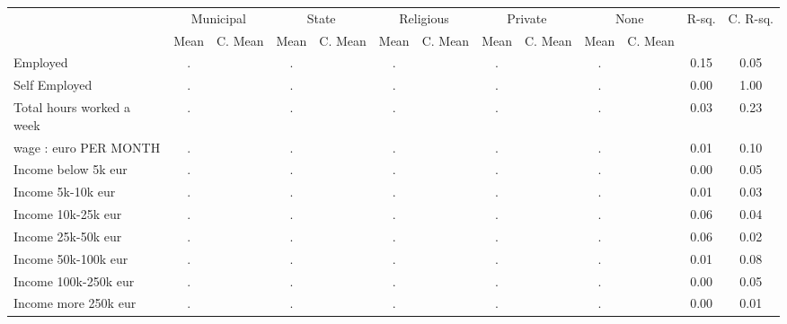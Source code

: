\begin{tabular}{l c c c c c c c c c c c c}
\toprule
& \multicolumn{2}{c}{Municipal} & \multicolumn{2}{c}{State} & \multicolumn{2}{c}{Religious} & \multicolumn{2}{c}{Private} & \multicolumn{2}{c}{None} & R-sq. & C. R-sq. \\
& \scriptsize Mean & \scriptsize C. Mean & \scriptsize Mean & \scriptsize C. Mean & \scriptsize Mean & \scriptsize C. Mean & \scriptsize Mean & \scriptsize C. Mean & \scriptsize Mean & \scriptsize C. Mean & & \\
\midrule
Employed   &         . & &         . & &         . & &         . & &         . & &      0.15 &      0.05 \\
Self Employed &         . & &         . & &         . & &         . & &         . & &      0.00 &      1.00 \\
Total hours worked a week &         . & &         . & &         . & &         . & &         . & &      0.03 &      0.23 \\
wage : euro PER MONTH &         . & &         . & &         . & &         . & &         . & &      0.01 &      0.10 \\
Income below 5k eur &         . & &         . & &         . & &         . & &         . & &      0.00 &      0.05 \\
Income 5k-10k eur &         . & &         . & &         . & &         . & &         . & &      0.01 &      0.03 \\
Income 10k-25k eur &         . & &         . & &         . & &         . & &         . & &      0.06 &      0.04 \\
Income 25k-50k eur &         . & &         . & &         . & &         . & &         . & &      0.06 &      0.02 \\
Income 50k-100k eur &         . & &         . & &         . & &         . & &         . & &      0.01 &      0.08 \\
Income 100k-250k eur &         . & &         . & &         . & &         . & &         . & &      0.00 &      0.05 \\
Income more 250k eur &         . & &         . & &         . & &         . & &         . & &      0.00 &      0.01 \\
\bottomrule
\end{tabular}
